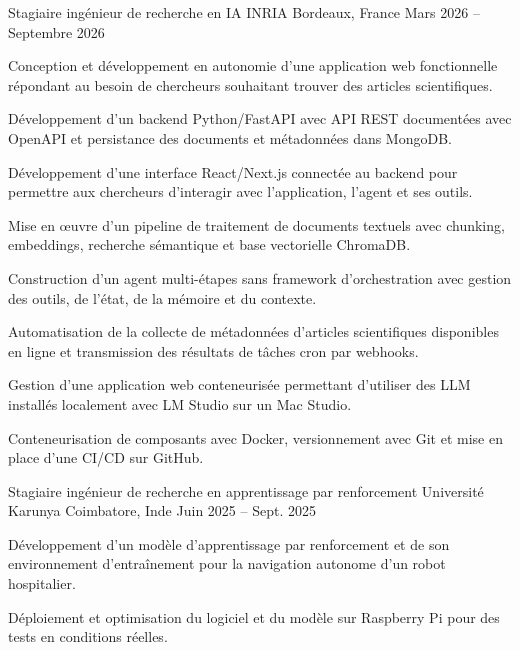 
\begin{cventries}
  \cventry
    {Stagiaire ingénieur de recherche en IA}
    {INRIA}
    {Bordeaux, France}
    {Mars 2026 -- Septembre 2026}
    {
      \begin{cvitems}
        \item {Conception et développement en autonomie d’une application web fonctionnelle répondant au besoin de chercheurs souhaitant trouver des articles scientifiques.}
        \item {Développement d’un backend Python/FastAPI avec API REST documentées avec OpenAPI et persistance des documents et métadonnées dans MongoDB.}
        \item {Développement d’une interface React/Next.js connectée au backend pour permettre aux chercheurs d’interagir avec l’application, l’agent et ses outils.}
        \item {Mise en œuvre d’un pipeline de traitement de documents textuels avec chunking, embeddings, recherche sémantique et base vectorielle ChromaDB.}
        \item {Construction d’un agent multi-étapes sans framework d’orchestration avec gestion des outils, de l’état, de la mémoire et du contexte.}
        \item {Automatisation de la collecte de métadonnées d’articles scientifiques disponibles en ligne et transmission des résultats de tâches cron par webhooks.}
        \item {Gestion d’une application web conteneurisée permettant d’utiliser des LLM installés localement avec LM Studio sur un Mac Studio.}
        \item {Conteneurisation de composants avec Docker, versionnement avec Git et mise en place d’une CI/CD sur GitHub.}
      \end{cvitems}
    }

  \cventry
    {Stagiaire ingénieur de recherche en apprentissage par renforcement}
    {Université Karunya}
    {Coimbatore, Inde}
    {Juin 2025 -- Sept. 2025}
    {
      \begin{cvitems}
        \item {Développement d’un modèle d’apprentissage par renforcement et de son environnement d’entraînement pour la navigation autonome d’un robot hospitalier.}
        \item {Déploiement et optimisation du logiciel et du modèle sur Raspberry Pi pour des tests en conditions réelles.}
      \end{cvitems}
    }
\end{cventries}
